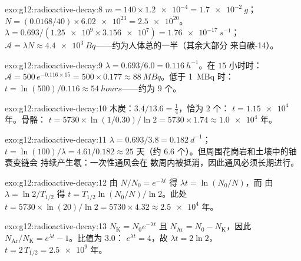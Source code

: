 \begin{solution}{exo:g12:radioactive-decay:8}
$m = 140 \times \num{1.2e-4} = \qty{1.7e-2}{g}$；
$N = (0.0168/40) \times \num{6.02e23} = \num{2.5e20}$。
$\lambda = 0.693/(\num{1.25e9} \times \num{3.156e7}) =
\qty{1.76e-17}{s^{-1}}$；$\mathcal A = \lambda N \approx
\qty{4.4e3}{Bq}$——约为人体总的一半（其余大部分
来自碳-14）。
\end{solution}

\begin{solution}{exo:g12:radioactive-decay:9}
$\lambda = 0.693/6.0 = \qty{0.116}{h^{-1}}$。在 $15$ 小时时：
$\mathcal A = 500\,e^{-0.116 \times 15} = 500 \times 0.177 \approx
\qty{88}{MBq}$。低于 \qty{1}{MBq} 时：
$t = \ln(500)/0.116 \approx \qty{54}{hours}$——约为 $9$
个。
\end{solution}

\begin{solution}{exo:g12:radioactive-decay:10}
木炭：$3.4/13.6 = \tfrac14$，恰为 $2$ 个：
$t = \num{1.15e4}$ 年。骨骼：
$t = \num{5730} \times \ln(1/0.30)/\ln 2 = \num{5730} \times 1.74
\approx \num{1.0e4}$ 年。
\end{solution}

\begin{solution}{exo:g12:radioactive-decay:11}
$\lambda = 0.693/3.8 = \qty{0.182}{d^{-1}}$；
$t = \ln(100)/\lambda = 4.61/0.182 \approx 25$ 天（约 $6.6$
个）。但周围花岗岩和土壤中的铀衰变链会
持续产生氡：一次性通风会在
数周内被抵消，因此通风必须长期进行。
\end{solution}

\begin{solution}{exo:g12:radioactive-decay:12}
由 $N/N_0 = e^{-\lambda t}$ 得 $\lambda t = \ln(N_0/N)$，而
由 $\lambda = \ln 2/T_{1/2}$ 得 $t = T_{1/2}\ln(N_0/N)/\ln 2$。此处
$t = \num{5730} \times \ln(20)/\ln 2 = \num{5730} \times 4.32
\approx \num{2.5e4}$ 年。
\end{solution}

\begin{solution}{exo:g12:radioactive-decay:13}
$N_{\mathrm K} = N_0 e^{-\lambda t}$ 且
$N_{\mathrm{Ar}} = N_0 - N_{\mathrm K}$，因此
$N_{\mathrm{Ar}}/N_{\mathrm K} = e^{\lambda t} - 1$。比值为 $3.0$：
$e^{\lambda t} = 4$，故 $\lambda t = 2\ln 2$，
$t = 2\,T_{1/2} = \num{2.5e9}$ 年。
\end{solution}

